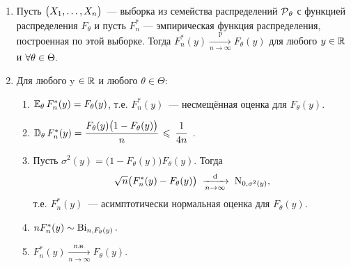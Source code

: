 \begin{namedthm}\leavevmode
    \begin{enumerate}
        \item Пусть $\bigl(X_1, \ldots, X_n \bigr)$~--- выборка из семейства распределений $\operatorname{\mathcal{P}}_{\theta}$ с функцией распределения $F_{\theta}$ и пусть $F_{n}^{*}$ — эмпирическая функция распределения, построенная по этой выборке. 
        Тогда $F_{n}^{*}(y) \xrightarrow[n \to \infty]{\text{p}} F_{\theta}(y)$ для любого $y \in \mathbb{R}$ и $\forall \theta \in \Theta.$
        \item Для любого y $\in \mathbb{R}$ и любого $\theta \in \Theta$:
        \begin{enumerate}[label={\arabic*)}]
            \item $\operatorname{\operatorname{\mathbb{E}}_{\theta}} F_{n}^{*}(y) = F_{\theta}(y)$, т.е. $F_{n}^{*}(y)$~--- несмещённая оценка для $F_{\theta}(y)$.
            \item $\operatorname{\mathbb{D}_{\theta}} F_{n}^{*}(y)=\cfrac{F_{\theta}(y)\bigl(1-F_{\theta}(y)\bigr)}{n} \: \leqslant \: \cfrac{1}{4n}$\, .
            \item Пусть $\sigma^2(y) = \bigl(1 - F_{\theta}(y)\bigr)F_{\theta}(y)$. 
            Тогда
            \begin{equation*}
                \sqrt{n}\bigl( F_{n}^{*}(y)-F_{\theta}(y) \bigr) \; \xrightarrow[n \to \infty]{\text{d}} \; \operatorname{\mathrm{N}}_{0, \sigma^2(y)},
            \end{equation*}
            т.е. $F_{n}^{*}(y)$~--- асимптотически нормальная оценка для $F_{\theta}(y)$.
            \item $n F_{n}^{*}(y) \sim \operatorname{\mathrm{Bi}}_{n, F_{\theta}(y)}.$
            \item $F_{n}^{*}(y) \xrightarrow[n \to \infty]{\text{п.н.}} F_{\theta}(y).$
        \end{enumerate}
    \end{enumerate}
\end{namedthm}

